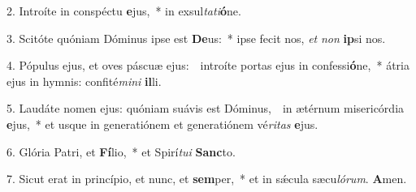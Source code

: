 
2. Introíte in conspéctu \textbf{e}jus,~* in exsul\textit{ta}\textit{ti}\textbf{ó}ne.

3. Scitóte quóniam Dóminus ipse est \textbf{De}us:~* ipse fecit nos, \textit{et} \textit{non} \textbf{ip}si nos.

4. Pópulus ejus, et oves páscuæ ejus:~\GreDagger\ introíte portas ejus in confessi\textbf{ó}ne,~* átria ejus in hymnis: confité\textit{mi}\textit{ni} \textbf{il}li.

5. Laudáte nomen ejus: quóniam suávis est Dóminus,~\GreDagger\ in ætérnum misericórdia \textbf{e}jus,~* et usque in generatiónem et generatiónem vé\textit{ri}\textit{tas} \textbf{e}jus.

6. Glória Patri, et \textbf{Fí}lio,~* et Spirí\textit{tu}\textit{i} \textbf{Sanc}to.

7. Sicut erat in princípio, et nunc, et \textbf{sem}per,~* et in s\'{\ae}cula sæcu\textit{ló}\textit{rum}. \textbf{A}men.